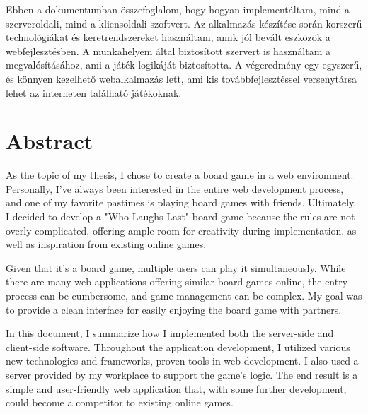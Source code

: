 \documentclass[a4paper,twoside]{article}
\begin{document}
Ebben a dokumentumban összefoglalom, hogy hogyan implementáltam, mind a szerveroldali,
mind a kliensoldali szoftvert. Az alkalmazás készítése során korszerű technológiákat és
keretrendszereket használtam, amik jól bevált eszközök a webfejlesztésben. A munkahelyem
által biztosított szervert is használtam a megvalósításához, ami a játék logikáját biztosította. A
végeredmény egy egyszerű, és könnyen kezelhető webalkalmazás lett, ami kis
továbbfejlesztéssel versenytársa lehet az interneten található játékoknak.


\newpage
\section{Abstract}
As the topic of my thesis, I chose to create a board game in a web environment. Personally, I've always been interested in the entire web development process, and one of my favorite pastimes is playing board games with friends. Ultimately, I decided to develop a "Who Laughs Last" board game because the rules are not overly complicated, offering ample room for creativity during implementation, as well as inspiration from existing online games.

Given that it's a board game, multiple users can play it simultaneously. While there are many web applications offering similar board games online, the entry process can be cumbersome, and game management can be complex. My goal was to provide a clean interface for easily enjoying the board game with partners.

In this document, I summarize how I implemented both the server-side and client-side software. Throughout the application development, I utilized various new technologies and frameworks, proven tools in web development. I also used a server provided by my workplace to support the game's logic. The end result is a simple and user-friendly web application that, with some further development, could become a competitor to existing online games.
\newpage
\end{document}
